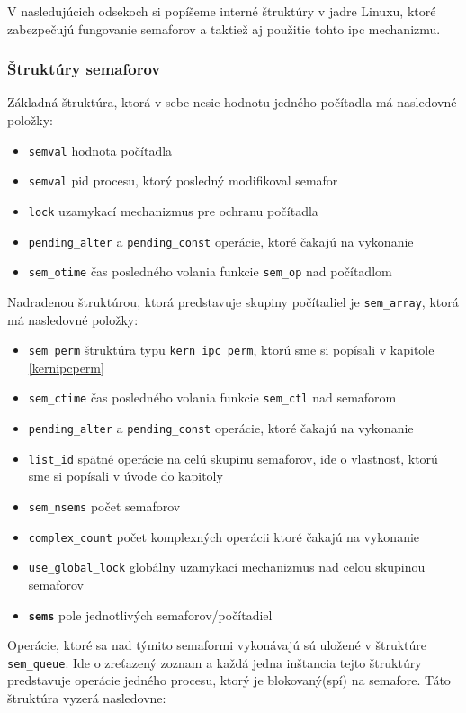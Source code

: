 V nasledujúcich odsekoch si popíšeme interné štruktúry v jadre Linuxu, ktoré zabezpečujú fungovanie semaforov a taktiež aj použitie tohto \acrshort{ipc} mechanizmu.\cite{linux}
\subsubsection{Štruktúry semaforov}
Základná štruktúra, ktorá v sebe nesie hodnotu jedného počítadla má nasledovné položky:
\begin{itemize}
\item \texttt{semval} hodnota počítadla
\item \texttt{semval} \acrshort{pid} procesu, ktorý posledný modifikoval semafor
\item \texttt{lock} uzamykací mechanizmus pre ochranu počítadla
\item \texttt{pending\_alter} a \texttt{pending\_const} operácie, ktoré čakajú na vykonanie
\item \texttt{sem\_otime} čas posledného volania funkcie \texttt{sem\_op} nad počítadlom
\end{itemize}
Nadradenou štruktúrou, ktorá predstavuje skupiny počítadiel je \texttt{sem\_array}, ktorá má nasledovné položky:
\begin{itemize}
\item \texttt{sem\_perm} štruktúra typu \texttt{kern\_ipc\_perm}, ktorú sme si popísali v kapitole \ref{kernipcperm}
\item \texttt{sem\_ctime} čas posledného volania funkcie \texttt{sem\_ctl} nad semaforom
\item \texttt{pending\_alter} a \texttt{pending\_const} operácie, ktoré čakajú na vykonanie
\item \texttt{list\_id} spätné operácie na celú skupinu semaforov, ide o vlastnosť, ktorú sme si popísali v úvode do kapitoly
\item \texttt{sem\_nsems} počet semaforov
\item \texttt{complex\_count} počet komplexných operácii ktoré čakajú na vykonanie
\item \texttt{use\_global\_lock} globálny uzamykací mechanizmus nad celou skupinou semaforov
\item \texttt{\textbf{sems}} pole jednotlivých semaforov/počítadiel
\end{itemize}
Operácie, ktoré sa nad týmito semaformi vykonávajú sú uložené v štruktúre \texttt{sem\_queue}. Ide o zreťazený zoznam a každá jedna inštancia tejto štruktúry predstavuje operácie jedného procesu, ktorý je blokovaný(spí) na semafore. Táto štruktúra vyzerá nasledovne:
